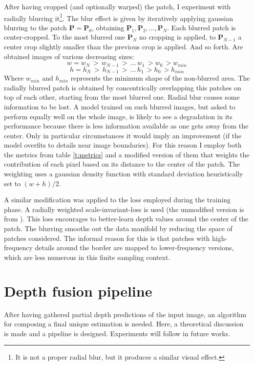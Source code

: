 After having cropped (and optionally warped) the patch, I experiment with radially blurring it\footnote{It is not a proper radial blur, but it produces a similar visual effect.}.
The blur effect is given by iteratively applying gaussian blurring to the patch $\mathbf{P} = \mathbf{P}_{0}$, obtaining $\mathbf{P}_{1}, \mathbf{P}_{2}, \dotsc, \mathbf{P}_{N}$.
Each blurred patch is center-cropped.
To the most blurred one $\mathbf{P}_{N}$ no cropping is applied, to $\mathbf{P}_{N-1}$ a center crop slightly smaller than the previous crop is applied.
And so forth.
Are obtained images of various decreasing sizes:
\[
    w = w_{N} \, > \, w_{N-1} \, > \, \dotsc \, w_{1} \, > w_{0} \, > w_{min}
\]\[
    h = h_{N} \, > \, h_{N-1} \, > \, \dotsc \, h_{1} \, > h_{0} \, > h_{min}
\]
Where $w_{min}$ and $h_{min}$ represents the minimum shape of the non-blurred area.
The radially blurred patch is obtained by concentrically overlapping this patches on top of each other, starting from the most blurred one.
Radial blur causes some information to be lost.
A model trained on such blurred images, but asked to perform equally well on the whole image, is likely to see a degradation in its performance because there is less information available as one gets away from the center.
Only in particular circumstances it would imply an improvement (if the model overfits to details near image boundaries).
For this reason I employ both the metrics from table \ref{t:metrics} and a modified version of them that weights the contribution of each pixel based on its distance to the center of the patch.
The weighting uses a gaussian density function with standard deviation heuristically set to $(w + h) / 2$.

A similar modification was applied to the loss employed during the training phase.
A radially weighted scale-invariant-loss is used (the unmodified version is from \cite{Eigen}).
This loss encourages to better-learn depth values around the center of the patch.
The blurring smooths out the data manifold by reducing the space of patches considered.
The informal reason for this is that patches with high-frequency details around the border are mapped to lower-frequency versions, which are less numerous in this finite sampling context.

\section{Depth fusion pipeline}
After having gathered partial depth predictions of the input image, an algorithm for composing a final unique estimation is needed.
Here, a theoretical discussion is made and a pipeline is designed.
Experiments will follow in future works.


